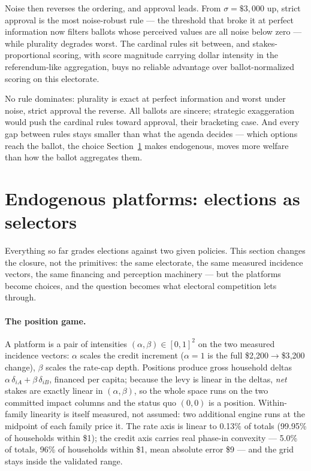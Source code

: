 \documentclass[11pt]{article}
\begin{document}
Noise then reverses the ordering, and approval leads. From
\(\sigma = \$3{,}000\) up, strict approval is the most noise-robust
rule --- the threshold that broke it at perfect information now filters
ballots whose perceived values are all noise below zero --- while
plurality degrades worst. The cardinal rules sit between, and
stakes-proportional scoring, with score magnitude carrying dollar
intensity in the referendum-like aggregation, buys no reliable
advantage over ballot-normalized scoring on this electorate.

No rule dominates: plurality is exact at perfect information and worst
under noise, strict approval the reverse. All ballots are sincere;
strategic exaggeration would push the cardinal rules toward approval,
their bracketing case. And every gap between rules stays smaller than
what the agenda decides --- which options reach the ballot, the choice
Section~\ref{sec:strategic} makes endogenous, moves more welfare than
how the ballot aggregates them.

\section{Endogenous platforms: elections as selectors}\label{sec:strategic}

Everything so far grades elections against two given policies. This
section changes the closure, not the primitives: the same electorate,
the same measured incidence vectors, the same financing and perception
machinery --- but the platforms become choices, and the question becomes
what electoral competition lets through.

\paragraph{The position game.} A platform is a pair of intensities
\((\alpha, \beta) \in [0,1]^2\) on the two measured incidence vectors:
\(\alpha\) scales the credit increment (\(\alpha = 1\) is the full
\$2{,}200\(\to\)\$3{,}200 change), \(\beta\) scales the rate-cap depth.
Positions produce gross household deltas \(\alpha\,\delta_{iA} +
\beta\,\delta_{iB}\), financed per capita; because the levy is linear in
the deltas, \emph{net} stakes are exactly linear in \((\alpha, \beta)\),
so the whole space runs on the two committed impact columns and the
status quo \((0,0)\) is a position. Within-family linearity is itself
measured, not assumed: two additional engine runs at the midpoint of
each family price it. The rate axis is linear to 0.13\% of totals
(99.95\% of households within \$1); the credit axis carries real
phase-in convexity --- 5.0\% of totals, 96\% of households within \$1,
mean absolute error \$9 --- and the grid stays inside the validated
range.
\end{document}

